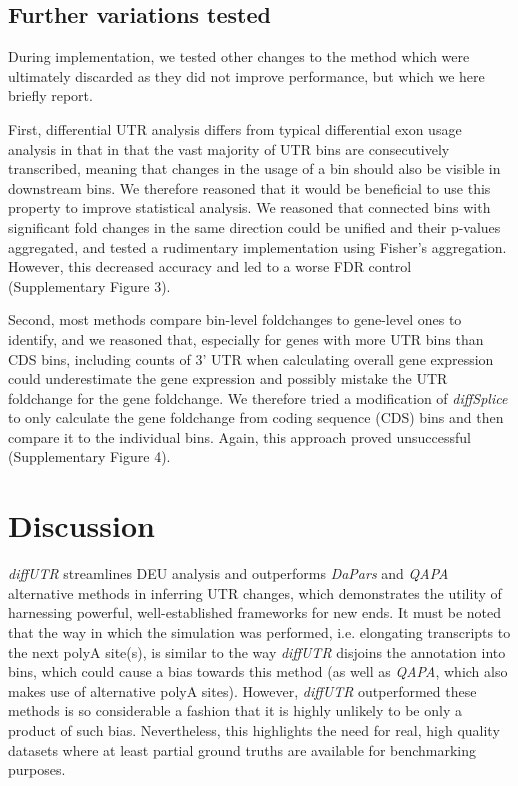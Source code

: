 \documentclass{bmcart}
\begin{document}
\subsection*{Further variations tested}

During implementation, we tested other changes to the method which were ultimately discarded as they did not improve performance, but which we here briefly report.

First, differential UTR analysis differs from typical differential exon usage analysis in that in that the vast majority of UTR bins are consecutively transcribed, meaning that changes in the usage of a bin should also be visible in downstream bins. We therefore reasoned that it would be beneficial to use this property to improve statistical analysis. We reasoned that connected bins with significant fold changes in the same direction could be unified and their p-values aggregated, and tested a rudimentary implementation using Fisher's aggregation. However, this decreased accuracy and led to a worse FDR control (Supplementary Figure 3).

Second, most methods compare bin-level foldchanges to gene-level ones to identify, and we reasoned that, especially for genes with more UTR bins than CDS bins, including counts of 3' UTR when calculating overall gene expression could underestimate the gene expression and possibly mistake the UTR foldchange for the gene foldchange. We therefore tried a modification of \textit{diffSplice} to only calculate the gene foldchange from coding sequence (CDS) bins and then compare it to the individual bins. Again, this approach proved unsuccessful (Supplementary Figure 4).

\section*{Discussion}

\textit{diffUTR} streamlines DEU analysis and outperforms \textit{DaPars} and \textit{QAPA} alternative methods in inferring UTR changes, which demonstrates the utility of harnessing powerful, well-established frameworks for new ends. It must be noted that the way in which the simulation was performed, i.e. elongating transcripts to the next polyA site(s), is similar to the way \textit{diffUTR} disjoins the annotation into bins, which could cause a bias towards this method (as well as \textit{QAPA}, which also makes use of alternative polyA sites). However, \textit{diffUTR} outperformed these methods is so considerable a fashion that it is highly unlikely to be only a product of such bias. Nevertheless, this highlights the need for real, high quality datasets where at least partial ground truths are available for benchmarking purposes.
\end{document}
